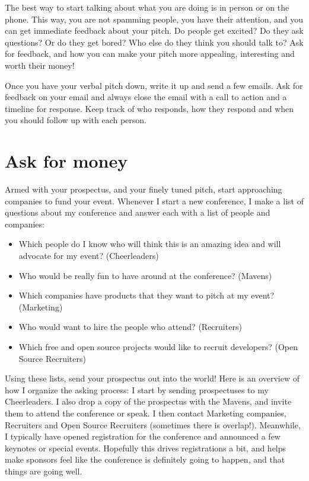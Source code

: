 The best way to start talking about what you are doing is in person or on the
phone. This way, you are not spamming people, you have their attention, and you
can get immediate feedback about your pitch. Do people get excited? Do they ask
questions? Or do they get bored? Who else do they think you should talk to? Ask
for feedback, and how you can make your pitch more appealing, interesting and
worth their money!

Once you have your verbal pitch down, write it up and send a few emails. Ask for
feedback on your email and always close the email with a call to action and a
timeline for response.  Keep track of who responds, how they respond and when
you should follow up with each person.

\section*{Ask for money}
Armed with your prospectus, and your finely tuned pitch, start approaching
companies to fund your event. Whenever I start a new conference, I make a list
of questions about my conference and answer each with a list of people and
companies: 
\begin{itemize}
\item Which people do I know who will think this is an amazing idea and will
advocate for my event? (Cheerleaders)
\item Who would be really fun to have around at the conference? (Mavens)
\item Which companies have products that they want to pitch at my event?
(Marketing)
\item Who would want to hire the people who attend? (Recruiters)
\item Which free and open source projects would like to recruit developers?
(Open Source Recruiters)
\end{itemize}

Using these lists, send your prospectus out into the world! Here is an overview
of how I organize the asking process: 
I start by sending prospectuses to my Cheerleaders. I also drop a copy of the
prospectus with the Mavens, and invite them to attend the conference or speak. I
then contact Marketing companies, Recruiters and Open Source Recruiters
(sometimes there is overlap!).
Meanwhile, I typically have opened registration for the conference and announced
a few keynotes or special events. Hopefully this drives registrations a bit, and
helps make sponsors feel like the conference is definitely going to happen, and
that things are going well.

